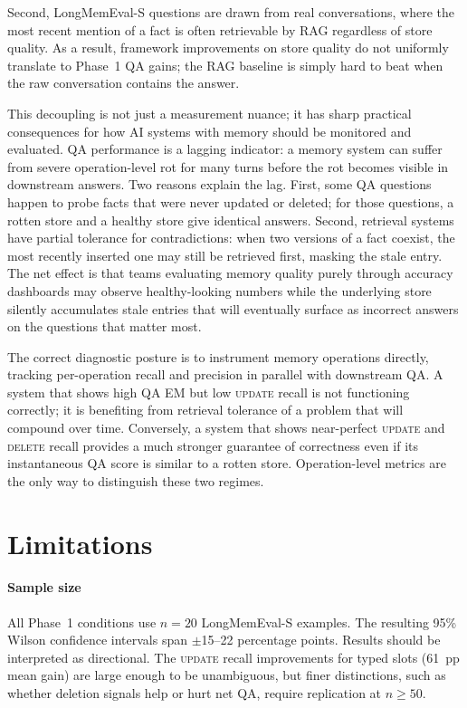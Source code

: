 \documentclass[10pt, twocolumn]{article}
\begin{document}
Second, LongMemEval-S questions are drawn from real conversations, where the
most recent mention of a fact is often retrievable by RAG regardless of
store quality.
As a result, framework improvements on store quality do not uniformly
translate to Phase~1 QA gains; the RAG baseline is simply hard to beat
when the raw conversation contains the answer.

This decoupling is not just a measurement nuance; it has sharp practical
consequences for how AI systems with memory should be monitored and
evaluated. QA performance is a lagging indicator: a memory system can
suffer from severe operation-level rot for many turns before the rot
becomes visible in downstream answers. Two reasons explain the lag.
First, some QA questions happen to probe facts that were never updated or
deleted; for those questions, a rotten store and a healthy store give
identical answers. Second, retrieval systems have partial tolerance for
contradictions: when two versions of a fact coexist, the most recently
inserted one may still be retrieved first, masking the stale entry.
The net effect is that teams evaluating memory quality purely through
accuracy dashboards may observe healthy-looking numbers while the underlying
store silently accumulates stale entries that will eventually surface as
incorrect answers on the questions that matter most.

The correct diagnostic posture is to instrument memory operations
directly, tracking per-operation recall and precision in parallel with
downstream QA. A system that shows high QA EM but low \textsc{update}
recall is not functioning correctly; it is benefiting from retrieval
tolerance of a problem that will compound over time. Conversely, a
system that shows near-perfect \textsc{update} and \textsc{delete}
recall provides a much stronger guarantee of correctness even if its
instantaneous QA score is similar to a rotten store.
Operation-level metrics are the only way to distinguish these two regimes.

\section{Limitations}
\label{sec:limitations}

\paragraph{Sample size}
All Phase~1 conditions use $n=20$ LongMemEval-S examples.
The resulting 95\% Wilson confidence intervals span $\pm$15--22 percentage
points.
Results should be interpreted as directional.
The \textsc{update} recall improvements for typed slots (61~pp mean gain)
are large enough to be unambiguous, but finer distinctions, such as whether
deletion signals help or hurt net QA, require replication at $n \geq 50$.
\end{document}

